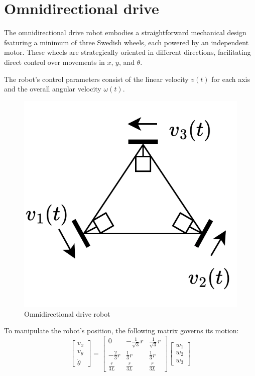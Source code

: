 \section{Omnidirectional drive}

The omnidirectional drive robot embodies a straightforward mechanical design featuring a minimum of three Swedish wheels, each powered by an independent motor.
These wheels are strategically oriented in different directions, facilitating direct control over movements in $x$, $y$, and $\theta$.

The robot's control parameters consist of the linear velocity $v(t)$ for each axis and the overall angular velocity $\omega(t)$. 
\begin{figure}[H]
    \centering
    \includegraphics[width=0.25\linewidth]{images/omni.png} 
    \caption{Omnidirectional drive robot}
\end{figure}
To manipulate the robot's position, the following matrix governs its motion:
\[\begin{bmatrix}
    v_x \\ 
    v_y \\
    \dot{\theta} 
\end{bmatrix} = 
\begin{bmatrix}
    0 & -\frac{1}{\sqrt{3}}r & \frac{1}{\sqrt{3}}r \\
    -\frac{2}{3}r & \frac{1}{3}r & \frac{1}{3}r \\
    \frac{r}{3L} & \frac{r}{3L} & \frac{r}{3L}
\end{bmatrix}\begin{bmatrix}
    w_1 \\ 
    w_2 \\
    w_3 
\end{bmatrix}\]
